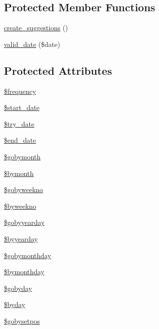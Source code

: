 \subsection*{\-Protected \-Member \-Functions}
\begin{DoxyCompactItemize}
\item 
\hyperlink{class_when_a048ca113f2564b96b1d5be8f04f119e4}{create\-\_\-suggestions} ()
\item 
\hyperlink{class_when_a253d57a0681be06af755e8f18a793ca6}{valid\-\_\-date} (\$date)
\end{DoxyCompactItemize}
\subsection*{\-Protected \-Attributes}
\begin{DoxyCompactItemize}
\item 
\hyperlink{class_when_ad965d6d26242232a1ea5e810947ee77d}{\$frequency}
\item 
\hyperlink{class_when_a6720ff61744e00a5bbbaa98676e7beb5}{\$start\-\_\-date}
\item 
\hyperlink{class_when_ac726436e39cc7252cd1ca6c0f636f15b}{\$try\-\_\-date}
\item 
\hyperlink{class_when_a2dc978f2a05472c5f99cc7bd2d0b5abd}{\$end\-\_\-date}
\item 
\hyperlink{class_when_aad00c8e2ddca0ca728f5c39abc66ce65}{\$gobymonth}
\item 
\hyperlink{class_when_a2960e64225996b24f544c5f6a82efe59}{\$bymonth}
\item 
\hyperlink{class_when_a58be6c219be700f106377416e3eee8e0}{\$gobyweekno}
\item 
\hyperlink{class_when_af53eb19e3c262d64bcda47bf441dd4ec}{\$byweekno}
\item 
\hyperlink{class_when_a500ec70777161d3066e95f7c7551b7a3}{\$gobyyearday}
\item 
\hyperlink{class_when_ab5b023a775eb407a1acc3a14f775740d}{\$byyearday}
\item 
\hyperlink{class_when_a259b16184aa8390f6becc888d1083c03}{\$gobymonthday}
\item 
\hyperlink{class_when_a4e995a36cbcb603b7c677ebe1b4b466b}{\$bymonthday}
\item 
\hyperlink{class_when_aa7c329dbfbead5deb6b8c405e0619cf2}{\$gobyday}
\item 
\hyperlink{class_when_a7c5b514dc4f18e1acf5d250804163d85}{\$byday}
\item 
\hyperlink{class_when_a9ae818cb1793028259c94c6f5338e7dd}{\$gobysetpos}

\end{DoxyCompactItemize}
